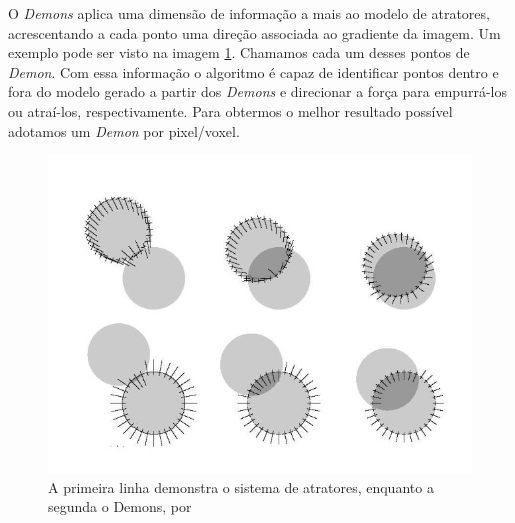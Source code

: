     O \textit{Demons} aplica uma dimensão de informação a mais ao modelo de atratores, acrescentando a cada ponto uma direção
associada ao gradiente da imagem. Um exemplo pode ser visto na imagem \ref{fig:demons}. 
Chamamos cada um desses pontos de \textit{Demon}. Com essa informação o algoritmo é capaz
de identificar pontos dentro e fora do modelo gerado a partir dos \textit{Demons} e direcionar a força para empurrá-los ou
atraí-los, respectivamente. Para obtermos o melhor resultado possível adotamos um \textit{Demon} por pixel/voxel.

\begin{figure}[H]
    \centering
    \includegraphics[width=1\textwidth]{figuras/demons.jpg}
    \caption{A primeira linha demonstra o sistema de atratores, enquanto a segunda o Demons, por \citep{thirion1995fast}}
    \label{fig:demons}
\end{figure}

